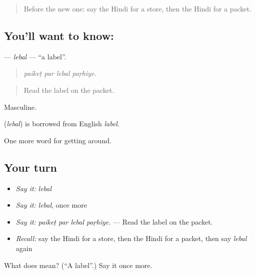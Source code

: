 \label{lesson:HI-C432-lebal}



\begin{quote}
Before the new one: say the Hindi for a store, then the Hindi for a packet.
\end{quote}

\subsection*{You'll want to know: }
\textbf{} — \emph{lebal} — \textquotedblleft{}a label\textquotedblright{}.

\begin{quote}
   
\end{quote}

\begin{quote}
\emph{paikeṭ par lebal paṛhiye.}
\end{quote}

\begin{quote}
Read the label on the packet.
\end{quote}

Masculine.

\begin{cousinweb}
\textbf{} (\emph{lebal}) is borrowed from English \emph{label}.
\end{cousinweb}

\begin{grammarlens}[title={What you've built}]
One more word for getting around.
\end{grammarlens}

\subsection*{Your turn}
\begin{itemize}
\raggedright
  \item \emph{Say it:} \emph{lebal}
  \item \emph{Say it:} \emph{lebal}, once more
  \item \emph{Say it:} \emph{paikeṭ par lebal paṛhiye.} — Read the label on the packet.
  \item \emph{Recall:} say the Hindi for a store, then the Hindi for a packet, then say \emph{lebal} again
\end{itemize}

\begin{tcolorbox}[breakable,colback=teal!4,colframe=teal!35!black,title={Before you move on}]
What does  mean? (\textquotedblleft{}A label\textquotedblright{}.) Say it once more.
\end{tcolorbox}
